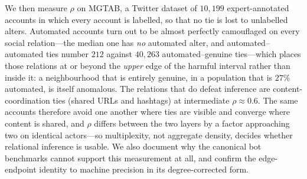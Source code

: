 \documentclass[fonts]{icst}
\theoremstyle{definition}
\begin{document}
{We then measure $\rho$ on MGTAB, a Twitter dataset of $10{,}199$ expert-annotated
accounts in which every account is labelled, so that no tie is lost to unlabelled
alters. Automated accounts turn out to be almost perfectly camouflaged on every
social relation---the median one has \emph{no} automated alter, and
automated--automated ties number $212$ against $40{,}263$ automated--genuine
ties---which places those relations at or beyond the \emph{upper} edge of the harmful
interval rather than inside it: a neighbourhood that is entirely genuine, in a
population that is $27\%$ automated, is itself anomalous. The relations that do defeat
inference are content-coordination ties (shared URLs and hashtags) at intermediate
$\rho \approx 0.6$. The same accounts therefore avoid one another where ties are
visible and converge where content is shared, and $\rho$ differs between the two
layers by a factor approaching two on identical actors---so multiplexity, not
aggregate density, decides whether relational inference is usable. We also document
why the canonical bot benchmarks cannot support this measurement at all, and confirm
the edge-endpoint identity to machine precision in its degree-corrected form.

}



\maketitle







\end{document}
